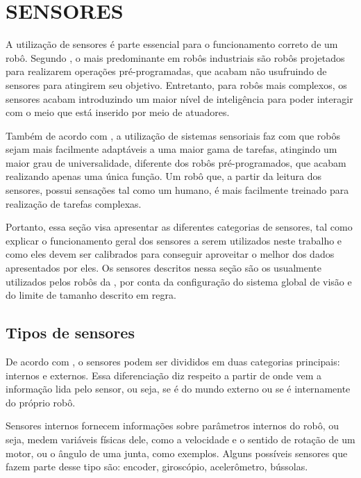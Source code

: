 \documentclass[acronym, symbols, table, deposito]{fei}
\begin{document}
	\section{SENSORES} \label{sec:sensores}
	
		A utilização de sensores é parte essencial para o funcionamento correto de um robô. Segundo \textcite{de2017tipos}, o mais predominante em robôs industriais são robôs projetados para realizarem operações pré-programadas, que acabam não usufruindo de sensores para atingirem seu objetivo. Entretanto, para robôs mais complexos, os sensores acabam introduzindo um maior nível de inteligência para poder interagir com o meio que está inserido por meio de atuadores.
		
		Também de acordo com \textcite{de2017tipos}, a utilização de sistemas sensoriais faz com que robôs sejam mais facilmente adaptáveis a uma maior gama de tarefas, atingindo um maior grau de universalidade, diferente dos robôs pré-programados, que acabam realizando apenas uma única função. Um robô que, a partir da leitura dos sensores, possui sensações tal como um humano, é mais facilmente treinado para realização de tarefas complexas.
		
		Portanto, essa seção visa apresentar as diferentes categorias de sensores, tal como explicar o funcionamento geral dos sensores a serem utilizados neste trabalho e como eles devem ser calibrados para conseguir aproveitar o melhor dos dados apresentados por eles. Os sensores descritos nessa seção são os usualmente utilizados pelos robôs da , por conta da configuração do sistema global de visão e do limite de tamanho descrito em regra.
		
		\subsection{Tipos de sensores}		
		
			De acordo com \textcite{sensorFusionKalmanFilter}, o sensores podem ser divididos em duas categorias principais: internos e externos. Essa diferenciação diz respeito a partir de onde vem a informação lida pelo sensor, ou seja, se é do mundo externo ou se é internamente do próprio robô.
			
			Sensores internos fornecem informações sobre parâmetros internos do robô, ou seja, medem variáveis físicas dele, como a velocidade e o sentido de rotação de um motor, ou o ângulo de uma junta, como exemplos. Alguns possíveis sensores que fazem parte desse tipo são: encoder, giroscópio, acelerômetro, bússolas.
			
\end{document}
